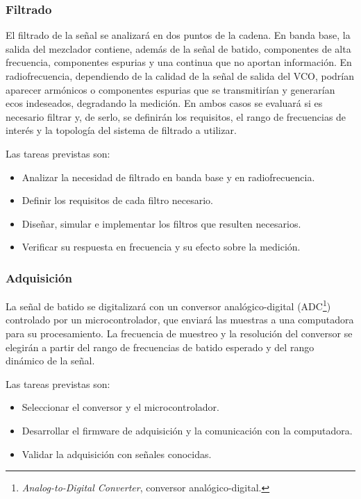\documentclass[11pt, a4paper, oneside]{article}
\newcommand{\sigla}[2]{#1\footnote{#2.}}
\begin{document}
\subsubsection{Filtrado}

El filtrado de la señal se analizará en dos puntos de la cadena. En
banda base, la salida del mezclador contiene, además de la señal de
batido, componentes de alta frecuencia, componentes espurias y una
continua que no aportan información. En radiofrecuencia, dependiendo de
la calidad de la señal de salida del VCO, podrían aparecer armónicos o
componentes espurias que se transmitirían y generarían ecos
indeseados, degradando la medición. En ambos casos se evaluará si es
necesario filtrar y, de serlo, se definirán los requisitos, el rango de
frecuencias de interés y la topología del sistema de filtrado a
utilizar.

Las tareas previstas son:
\begin{itemize}
  \item Analizar la necesidad de filtrado en banda base y en
        radiofrecuencia.
  \item Definir los requisitos de cada filtro necesario.
  \item Diseñar, simular e implementar los filtros que resulten
        necesarios.
  \item Verificar su respuesta en frecuencia y su efecto sobre la
        medición.
\end{itemize}

\subsubsection{Adquisición}

La señal de batido se digitalizará con un conversor analógico-digital
(\sigla{ADC}{\textit{Analog-to-Digital Converter}, conversor
analógico-digital}) controlado por un microcontrolador, que enviará las
muestras a una computadora para su procesamiento. La frecuencia de muestreo y la resolución del conversor se
elegirán a partir del rango de frecuencias de batido esperado y del
rango dinámico de la señal.

Las tareas previstas son:
\begin{itemize}
  \item Seleccionar el conversor y el microcontrolador.
  \item Desarrollar el firmware de adquisición y la comunicación con la
        computadora.
  \item Validar la adquisición con señales conocidas.
\end{itemize}
\end{document}
